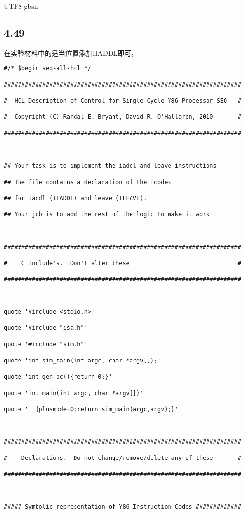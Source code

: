 \documentclass {article}
\begin{document}
\begin {CJK*} {UTF8} {gbsn}
			\subsection{4.49}
				在实验材料中的适当位置添加IIADDL即可。
				\begin{lstlisting}
#/* $begin seq-all-hcl */

####################################################################

#  HCL Description of Control for Single Cycle Y86 Processor SEQ   #

#  Copyright (C) Randal E. Bryant, David R. O'Hallaron, 2010       #

####################################################################



## Your task is to implement the iaddl and leave instructions

## The file contains a declaration of the icodes

## for iaddl (IIADDL) and leave (ILEAVE).

## Your job is to add the rest of the logic to make it work



####################################################################

#    C Include's.  Don't alter these                               #

####################################################################



quote '#include <stdio.h>'

quote '#include "isa.h"'

quote '#include "sim.h"'

quote 'int sim_main(int argc, char *argv[]);'

quote 'int gen_pc(){return 0;}'

quote 'int main(int argc, char *argv[])'

quote '  {plusmode=0;return sim_main(argc,argv);}'



####################################################################

#    Declarations.  Do not change/remove/delete any of these       #

####################################################################



##### Symbolic representation of Y86 Instruction Codes #############


\end{lstlisting}
\end{CJK*}
\end{document}
